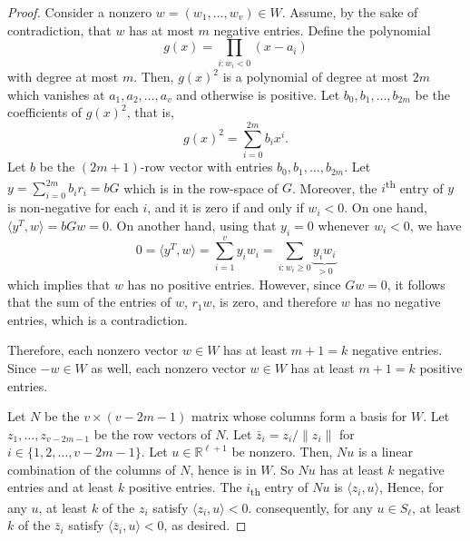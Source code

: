 \begin{proof}
    Consider a nonzero \(w = (w_1, \ldots, w_v) \in W\).
    Assume, by the sake of contradiction,
    that \(w\) has at most \(m\) negative entries.
    Define the polynomial
    \begin{equation}
        g(x) = \prod_{i : w_i < 0} (x - a_i)
    \end{equation}
    with degree at most \(m\).
    Then, \(g(x)^2\) is a polynomial of degree at most \(2m\)
    which vanishes at \(a_1, a_2, \ldots, a_v\) and otherwise is positive.
    Let \(b_0, b_1, \ldots, b_{2m}\) be the coefficients of \(g(x)^2\), that is,
    \begin{equation}
        g(x)^2 = \sum_{i=0}^{2m} b_i x^i.
    \end{equation}
    Let \(b\) be the \((2m+1)\)-row vector with entries \(b_0, b_1, \ldots, b_{2m}\).
    Let \(y = \sum_{i=0}^{2m} b_i r_i = bG\) which is in the row-space of \(G\).
    Moreover, the \(i\)\textsuperscript{th} entry of \(y\) is non-negative for each \(i\), and it is zero if and only if \(w_i < 0\).
    On one hand, \(\langle y^T, w \rangle = bGw = 0\).
    On another hand, using that \(y_i = 0\) whenever \(w_i < 0\), we have
    \begin{equation}
        0 =
        \langle y^T, w \rangle =
        \sum_{i=1}^{v} y_i w_i =
        \sum_{i : w_i \geq 0} \underbrace{y_iw_i}_{> 0}
    \end{equation}
    which implies that \(w\) has no positive entries.
    However, since \(Gw = 0\), it follows that the sum of the entries of \(w\), \(r_1w\), is zero, and therefore \(w\) has no negative entries, which is a contradiction.

    Therefore, each nonzero vector \(w \in W\) has at least \(m+1 = k\) negative entries. Since \(-w \in W\) as well, each nonzero vector \(w \in W\) has at least \(m+1 = k\) positive entries.

    Let \(N\) be the \(v \times (v - 2m - 1)\) matrix whose columns form a basis for \(W\).
    Let \(z_1,\ldots, z_{v-2m-1}\) be the row vectors of \(N\).
    Let \(\bar{z}_i = z_i / \|z_i\|\) for \(i \in \{1, 2, \ldots, v-2m-1\}\).
    Let \(u \in \mathbb{R}^{\ell + 1}\) be nonzero.
    Then, \(Nu\) is a linear combination of the columns of \(N\),
    hence is in \(W\).
    So \(Nu\) has at least \(k\) negative entries and at least \(k\) positive entries.
    The \(i\)\textsubscript{th} entry of \(Nu\) is \(\langle z_i, u \rangle\),
    Hence, for any \(u\), at least \(k\) of the \(z_i\) satisfy \(\langle z_i, u \rangle < 0\).
    consequently, for any \(u \in S_\ell\), at least \(k\) of the \(\bar{z}_i\) satisfy \(\langle \bar{z}_i, u \rangle < 0\), as desired.
\end{proof}

